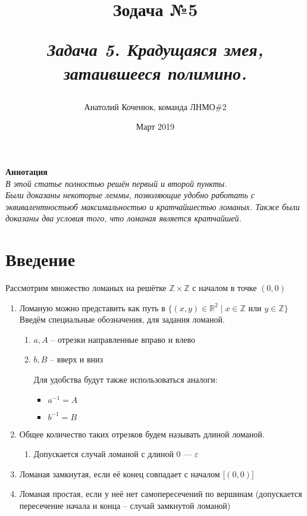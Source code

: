\documentclass[12pt,a4paper, flushleft]{article}
\author{Анатолий Коченюк, команда ЛНМО\#2}
\date{Март 2019}
\title{Зодача \textsuperscript{\textregistered} №5}
\title{
	\vspace{4cm}	
	\horline{380}	
	\begin{center}
		\begin{Huge}
			\textbf{\emph{Задача 5. Крадущаяся змея, затаившееся полимино.}}
		\end{Huge}
	\end{center}	
	\vspace{-1.3cm}	
	\horline{400}
}
\begin{document}
\maketitle
\vspace{4cm}
	
	\begin{myquote}
	\begin{center}
		\textbf{Аннотация}\\
		\textit{
			В этой статье полностью решён первый и второй пункты.\\
			Были доказаны некоторые леммы, позволяющие удобно работать с эквивалентностьюб максимальностью и кратчайшестью ломаных.
			Также были доказаны два условия того, что ломаная является кратчайшей.
		}
	\end{center}
	\end{myquote}	
	
	\pagebreak

	\tableofcontents	
	
	\pagebreak

\section*{Введение}

Рассмотрим множество ломаных на решётке $\mathds{Z}\times \mathds{Z}$ с началом в точке $(0, 0)$

\begin{enumerate}
	\item Ломаную можно представить как путь в $\{(x, y)\in\mathds{R}^2\mid x\in \mathds{Z} \text{ или } y\in\mathds{Z}\}$
	Введём специальные обозначения, для задания ломаной.
	\begin{enumerate}
		\item[] $a, A$ -- отрезки направленные вправо и влево
		\item[] $b, B$ -- вверх и вниз
		
		Для удобства будут также использоваться аналоги:
		\begin{itemize}
			\item $a^{-1} = A$
			\item $b^{-1} = B$
		\end{itemize}
	\end{enumerate}
	\item Общее количество таких отрезков будем называть длиной ломаной.
	\begin{enumerate}
		\item []Допускается случай ломаной с длиной 0 --- $\varepsilon$
	\end{enumerate}
	\item Ломаная замкнутая, если её конец совпадает с началом [$(0, 0)$]
	\item Ломаная простая, если у неё нет самопересечений по вершинам (допускается пересечение начала и конца -- случай замкнутой ломаной)	
\end{enumerate}
\end{document}
